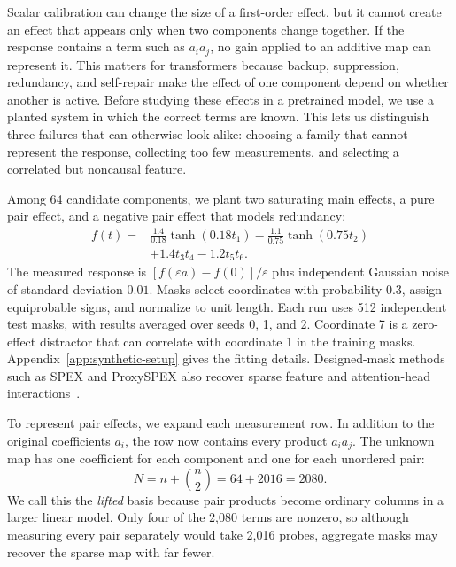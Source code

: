 \documentclass[sigconf,10pt,nonacm,balance=false]{acmart}
\newcommand{\eps}{\varepsilon}
\begin{document}
Scalar calibration can change the size of a first-order effect, but it cannot create an effect that appears only when two components change together. If the response contains a term such as $a_i a_j$, no gain applied to an additive map can represent it. This matters for transformers because backup, suppression, redundancy, and self-repair make the effect of one component depend on whether another is active. Before studying these effects in a pretrained model, we use a planted system in which the correct terms are known. This lets us distinguish three failures that can otherwise look alike: choosing a family that cannot represent the response, collecting too few measurements, and selecting a correlated but noncausal feature.

Among 64 candidate components, we plant two saturating main effects, a pure pair effect, and a negative pair effect that models redundancy:
\begin{equation}\label{eq:synthetic-response}
\begin{aligned}
f(t)={}&\frac{1.4}{0.18}\tanh(0.18t_1)-\frac{1.1}{0.75}\tanh(0.75t_2)\\
&+1.4t_3t_4-1.2t_5t_6.
\end{aligned}
\end{equation}
The measured response is $[f(\eps a)-f(0)]/\eps$ plus independent Gaussian noise of standard deviation $0.01$. Masks select coordinates with probability $0.3$, assign equiprobable signs, and normalize to unit length. Each run uses 512 independent test masks, with results averaged over seeds 0, 1, and 2. Coordinate 7 is a zero-effect distractor that can correlate with coordinate 1 in the training masks. Appendix~\ref{app:synthetic-setup} gives the fitting details. Designed-mask methods such as SPEX and ProxySPEX also recover sparse feature and attention-head interactions~\cite{kang2025spex,butler2025proxyspex}.

To represent pair effects, we expand each measurement row. In addition to the original coefficients $a_i$, the row now contains every product $a_i a_j$. The unknown map has one coefficient for each component and one for each unordered pair:
\begin{equation}
    N = n + \binom{n}{2} = 64 + 2016 = 2080.
\end{equation}
We call this the \emph{lifted} basis because pair products become ordinary columns in a larger linear model. Only four of the 2,080 terms are nonzero, so although measuring every pair separately would take 2,016 probes, aggregate masks may recover the sparse map with far fewer.
\end{document}
